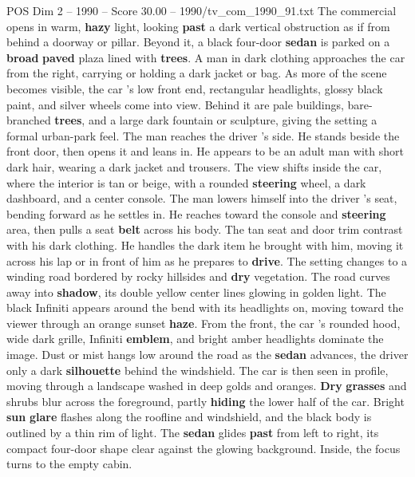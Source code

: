 \begin{textsample}{POS Dim 2 – 1990 – Score 30.00 – 1990/tv\_com\_1990\_91.txt}  \label{ex:f2_pos_031}
The commercial opens in warm, \textbf{hazy} light, looking \textbf{past} a dark vertical obstruction as if from behind a doorway or pillar.
Beyond it, a black four-door \textbf{sedan} is parked on a \textbf{broad} \textbf{paved} plaza lined with \textbf{trees}.
A man in dark clothing approaches the car from the right, carrying or holding a dark jacket or bag.
As more of the scene becomes visible, the car ’s low front end, rectangular headlights, glossy black paint, and silver wheels come into view.
Behind it are pale buildings, bare-branched \textbf{trees}, and a large dark fountain or sculpture, giving the setting a formal urban-park feel.
The man reaches the driver ’s side.
He stands beside the front door, then opens it and leans in.
He appears to be an adult man with short dark hair, wearing a dark jacket and trousers.
The view shifts inside the car, where the interior is tan or beige, with a rounded \textbf{steering} wheel, a dark dashboard, and a center console.
The man lowers himself into the driver ’s seat, bending forward as he settles in.
He reaches toward the console and \textbf{steering} area, then pulls a seat \textbf{belt} across his body.
The tan seat and door trim contrast with his dark clothing.
He handles the dark item he brought with him, moving it across his lap or in front of him as he prepares to \textbf{drive}.
The setting changes to a winding road bordered by rocky hillsides and \textbf{dry} vegetation.
The road curves away into \textbf{shadow}, its double yellow center lines glowing in golden light.
The black Infiniti appears around the bend with its headlights on, moving toward the viewer through an orange sunset \textbf{haze}.
From the front, the car ’s rounded hood, wide dark grille, Infiniti \textbf{emblem}, and bright amber headlights dominate the image.
Dust or mist hangs low around the road as the \textbf{sedan} advances, the driver only a dark \textbf{silhouette} behind the windshield.
The car is then seen in profile, moving through a landscape washed in deep golds and oranges. \textbf{Dry} \textbf{grasses} and shrubs blur across the foreground, partly \textbf{hiding} the lower half of the car.
Bright \textbf{sun} \textbf{glare} flashes along the roofline and windshield, and the black body is outlined by a thin rim of light.
The \textbf{sedan} glides \textbf{past} from left to right, its compact four-door shape clear against the glowing background.
Inside, the focus turns to the empty cabin.

\end{textsample}
